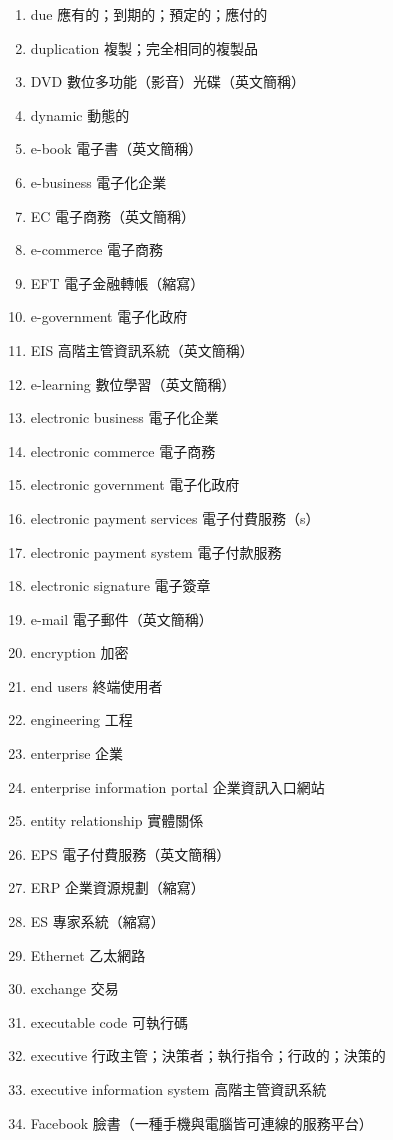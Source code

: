 \begin{enumerate}
  \item due 應有的；到期的；預定的；應付的
  \item duplication 複製；完全相同的複製品
  \item DVD 數位多功能（影音）光碟（英文簡稱）
  \item dynamic 動態的
  \item e-book 電子書（英文簡稱）
  \item e-business 電子化企業
  \item EC 電子商務（英文簡稱）
  \item e-commerce 電子商務
  \item EFT 電子金融轉帳（縮寫）
  \item e-government 電子化政府
  \item EIS 高階主管資訊系統（英文簡稱）
  \item e-learning 數位學習（英文簡稱）
  \item electronic business 電子化企業
  \item electronic commerce 電子商務
  \item electronic government 電子化政府
  \item electronic payment services 電子付費服務（s）
  \item electronic payment system 電子付款服務
  \item electronic signature 電子簽章
  \item e-mail 電子郵件（英文簡稱）
  \item encryption 加密
  \item end users 終端使用者
  \item engineering 工程
  \item enterprise 企業
  \item enterprise information portal 企業資訊入口網站
  \item entity relationship 實體關係
  \item EPS 電子付費服務（英文簡稱）
  \item ERP 企業資源規劃（縮寫）
  \item ES 專家系統（縮寫）
  \item Ethernet 乙太網路
  \item exchange 交易
  \item executable code 可執行碼
  \item executive 行政主管；決策者；執行指令；行政的；決策的
  \item executive information system 高階主管資訊系統
  \item Facebook 臉書（一種手機與電腦皆可連線的服務平台）

\end{enumerate}
